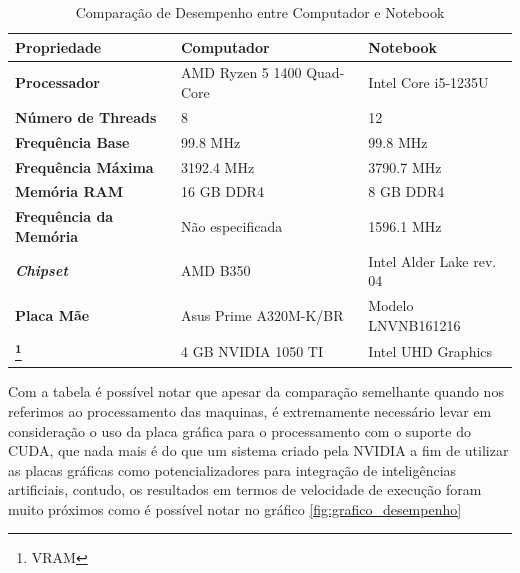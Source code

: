 \begin{table}[h!]
	\centering
	\begin{tabular}{|p{4cm}|p{5cm}|p{5cm}|}
	\hline
	\textbf{Propriedade}         & \textbf{Computador}                & \textbf{Notebook}                     \\ \hline
	\textbf{Processador}          & AMD Ryzen 5 1400 Quad-Core        & Intel Core i5-1235U                   \\ \hline
	\textbf{Número de Threads}    & 8                                 & 12                                    \\ \hline
	\textbf{Frequência Base}      & 99.8 MHz                          & 99.8 MHz                              \\ \hline
	\textbf{Frequência Máxima}    & 3192.4 MHz                        & 3790.7 MHz                            \\ \hline
	\textbf{Memória RAM}          & 16 GB DDR4                        & 8 GB DDR4                             \\ \hline
	\textbf{Frequência da Memória}& Não especificada                  & 1596.1 MHz                            \\ \hline
	\textbf{\textit{Chipset}}     & AMD B350                          & Intel Alder Lake rev. 04              \\ \hline
	\textbf{Placa Mãe}            & Asus Prime A320M-K/BR             & Modelo LNVNB161216                    \\ \hline
	\textbf{\footnote{VRAM}}      & 4 GB NVIDIA 1050 TI               & Intel UHD Graphics                    \\ \hline
	\end{tabular}
	\caption{Comparação de Desempenho entre Computador e Notebook}
	\label{tab:comparacao_desempenho}
\end{table}

Com a tabela é possível notar que apesar da comparação semelhante quando nos referimos ao processamento das maquinas, é extremamente necessário levar em consideração o uso da placa gráfica para o processamento com o suporte do CUDA, que nada mais é do que um sistema criado pela NVIDIA a fim de utilizar as placas gráficas como potencializadores para integração de inteligências artificiais, contudo, os resultados em termos de velocidade de execução foram muito próximos como é possível notar no gráfico \ref{fig:grafico_desempenho}

